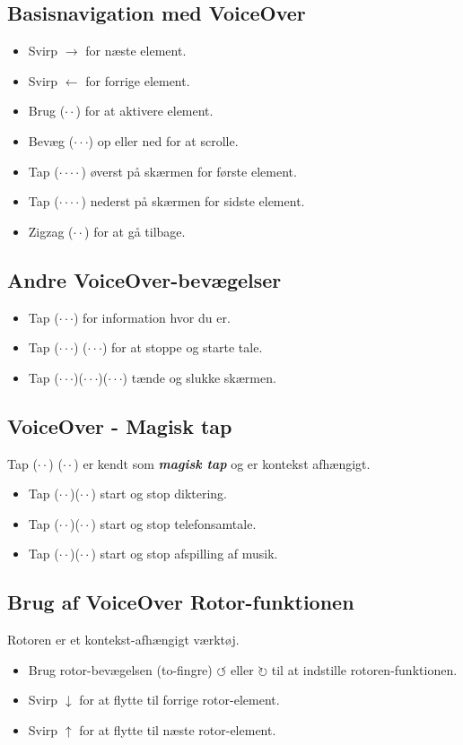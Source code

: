 \documentclass[a4paper, landscape, 10pt]{scrartcl}
\begin{document}
\begin{multicols}{2}
\subsection*{Basisnavigation med VoiceOver}
\begin{itemize}
  \item{Svirp $\rightarrow$ for næste element.}
  \item{Svirp $\leftarrow$ for forrige element.}
  \item{Brug ($\cdot\cdot$) for at aktivere element.}
  \item{Bevæg ($\cdot\cdot\cdot$) op eller ned for at scrolle.}
  \item{Tap ($\cdot\cdot\cdot\cdot$) øverst på skærmen for første element.}
  \item{Tap ($\cdot\cdot\cdot\cdot$) nederst på skærmen for sidste element.}
  \item{Zigzag ($\cdot\cdot$) for at gå tilbage.}
\end{itemize}

\subsection*{Andre VoiceOver-bevægelser}
\begin{itemize}
  \item{Tap ($\cdot\cdot\cdot$) for information hvor du er.}
  \item{Tap ($\cdot\cdot\cdot$) ($\cdot\cdot\cdot$) for at stoppe og starte tale.}
  \item{Tap ($\cdot\cdot\cdot$)($\cdot\cdot\cdot$)($\cdot\cdot\cdot$) tænde og slukke skærmen.}
\end{itemize}

\subsection*{VoiceOver - Magisk tap}
Tap ($\cdot\cdot$) ($\cdot\cdot$) er kendt som  \textbf{\textit{magisk tap}} og er kontekst afhængigt.
\begin{itemize}
  \item{Tap ($\cdot\cdot$)($\cdot\cdot$) start og stop diktering.}
  \item{Tap ($\cdot\cdot$)($\cdot\cdot$) start og stop telefonsamtale.}
  \item{Tap ($\cdot\cdot$)($\cdot\cdot$) start og stop afspilling af musik.}
\end{itemize}

\subsection*{Brug af VoiceOver Rotor-funktionen}
Rotoren er et kontekst-afhængigt værktøj. 
\begin{itemize}
  \item{Brug rotor-bevægelsen (to-fingre) $\circlearrowleft{}$ eller $\circlearrowright$ til at indstille rotoren-funktionen.}
  \item{Svirp $\downarrow$ for at flytte til forrige rotor-element.}
  \item{Svirp $\uparrow$ for at flytte til næste rotor-element.}
\end{itemize}


\end{multicols}
\end{document}

